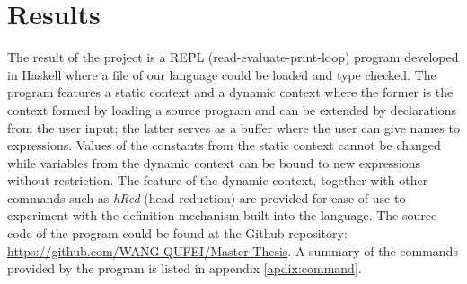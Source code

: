 \chapter{Results}\label{chapter:results}
The result of the project is a REPL (read-evaluate-print-loop) program developed in Haskell where a file of our language could be loaded and type checked. The program features a static context and a dynamic context where the former is the context formed by loading a source program and can be extended by declarations from the user input; the latter serves as a buffer where the user can give names to expressions. Values of the constants from the static context cannot be changed while variables from the dynamic context can be bound to new expressions without restriction. The feature of the dynamic context, together with other commands such as \emph{hRed} (head reduction) are provided for ease of use to experiment with the definition mechanism built into the language. The source code of the program could be found at the Github repository: \url{https://github.com/WANG-QUFEI/Master-Thesis}. A summary of the commands provided by the program is listed in appendix \ref{apdix:command}.